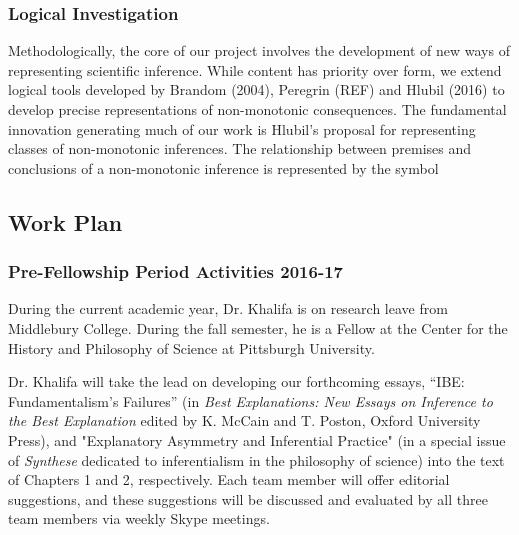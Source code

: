 \documentclass{article}[11pt]
\makeatletter
\newcommand{\nmc}{%
	\mathbin{\mathpalette\nm@\expandafter}
}
\newcommand{\nm@}{\mid\joinrel\mkern-.5mu\sim\mkern-3mu}
\makeatother
\begin{document}
\subsubsection*{Logical Investigation}

Methodologically, the core of our project involves the development of new ways of representing scientific inference.  While content has priority over form, we extend logical tools developed by Brandom (2004), Peregrin (REF) and Hlubil (2016) to develop precise representations of non-monotonic consequences.  The fundamental innovation generating much of our work is Hlubil's proposal for representing classes of non-monotonic inferences. The relationship between premises and conclusions of a non-monotonic inference is represented by the symbol %

\subsection{Work Plan}


%

\subsubsection*{Pre-Fellowship Period Activities 2016-17}

During the current academic year, Dr. Khalifa is on research leave from Middlebury College.  During the fall semester, he is a Fellow at the Center for the History and Philosophy of Science at Pittsburgh University.  

Dr. Khalifa will take the lead on developing our forthcoming essays, ``IBE: Fundamentalism's Failures'' (in \textit{Best Explanations: New Essays on Inference to the Best Explanation} edited by K. McCain and T. Poston, Oxford University Press), and "Explanatory Asymmetry and Inferential Practice" (in a special issue of \textit{Synthese} dedicated to inferentialism in the philosophy of science) into the text of Chapters 1 and 2, respectively.  Each team member will offer editorial suggestions, and these suggestions will be discussed and evaluated by all three team members via weekly Skype meetings.
\end{document}
